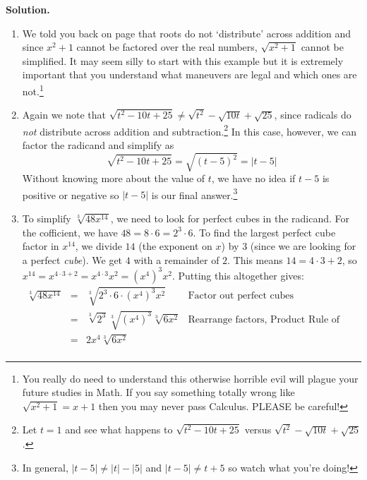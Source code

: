 \begin{ex}
{\bf Solution.}

\begin{enumerate}

\item We told you back on page \pageref{donotdistributeexponents} that roots do not `distribute' across addition and since $x^{2} + 1$ cannot be factored over the real numbers, $\sqrt{x^{2} + 1}$ cannot be simplified.  It may seem silly to start with this example but it is extremely important that you understand what maneuvers are legal and which ones are not.\footnote{You really do need to understand this otherwise horrible evil will plague your future studies in Math.  If you say something totally wrong like $\sqrt{x^{2} + 1} = x + 1$ then you may never pass Calculus.  PLEASE be careful!}

\item Again we note that $\sqrt{t^2-10t+25}  \neq \sqrt{t^2} - \sqrt{10t} + \sqrt{25}$, since radicals do \textit{not} distribute across addition and subtraction.\footnote{Let $t = 1$ and see what happens to $\sqrt{t^2-10t+25}$  versus $\sqrt{t^2} - \sqrt{10t} + \sqrt{25}$.}  In this case, however, we can factor the radicand and simplify as \[ \sqrt{t^2 - 10t + 25} = \sqrt{(t-5)^2} = |t-5| \]
Without knowing more about the value of $t$, we have no idea if $t-5$ is positive or negative so $|t-5|$ is our final answer.\footnote{In general,  $|t-5| \neq |t| - |5|$ and  $|t-5| \neq t + 5$ so watch what you're doing!}

\item  To simplify $\sqrt[3]{48x^{14}}$, we need to look for perfect cubes in the radicand.  For the cofficient, we have $48 = 8 \cdot 6 = 2^3 \cdot 6$.  To find the largest perfect cube factor in $x^{14}$, we divide $14$ (the exponent on $x$) by $3$ (since we are looking for a perfect \textit{cube}).  We get $4$ with a remainder of $2$.  This means $14 = 4 \cdot 3 + 2$, so $x^{14} = x^{4 \cdot 3 + 2} = x^{4 \cdot 3} x^2 = (x^4)^3 x^2$.  Putting this altogether gives:\[\begin{array}{rclr}

\sqrt[3]{48x^{14}} & = & \sqrt[3]{2^3 \cdot 6 \cdot(x^4)^3 x^2} & \text{Factor out perfect cubes} \\ [2pt]
                   & = & \sqrt[3]{2^3} \sqrt[3]{(x^4)^3} \sqrt[3]{6x^2} & \text{Rearrange factors,  Product Rule of Radicals} \\ [2pt]
									 & = & 2x^4\sqrt[3]{6x^2} & \\
\end{array} \]


\end{enumerate}
\end{ex}
